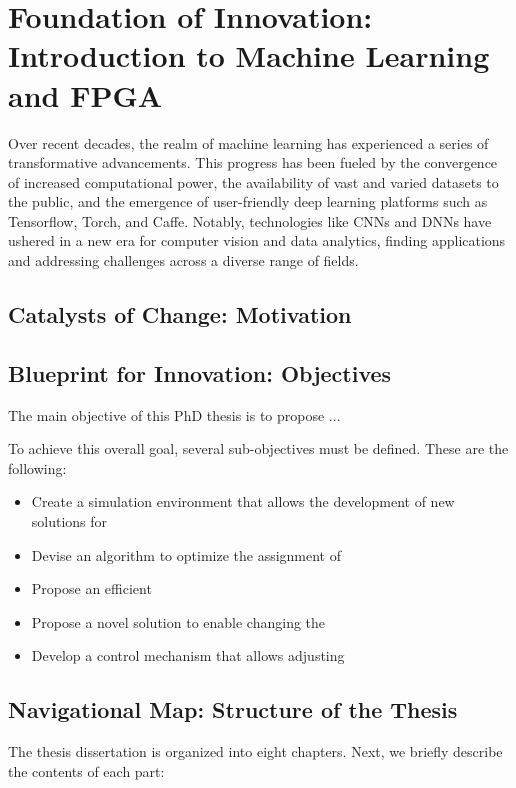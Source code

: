 \chapter{Foundation of Innovation: Introduction to Machine Learning and FPGA}

Over recent decades, the realm of machine learning has experienced a series of transformative advancements. This progress has been fueled by the convergence of increased computational power, the availability of vast and varied datasets to the public, and the emergence of user-friendly deep learning platforms such as Tensorflow, Torch, and Caffe. Notably, technologies like \acp{CNN} and \acp{DNN} have ushered in a new era for computer vision and data analytics, finding applications and addressing challenges across a diverse range of fields.


\section{Catalysts of Change: Motivation}


\section{Blueprint for Innovation: Objectives}

The main objective of this PhD thesis is to propose ...

To achieve this overall goal, several sub-objectives must be defined. These are the following:

\begin{itemize}
    \item Create a simulation environment that allows the development of new solutions for
    \item Devise an algorithm to optimize the assignment of 
    \item Propose an efficient 
    \item Propose a novel solution to enable changing the 
    \item Develop a control mechanism that allows adjusting
\end{itemize}


\section{Navigational Map: Structure of the Thesis}
The thesis dissertation is organized into eight chapters. Next, we briefly describe the contents of each part:

